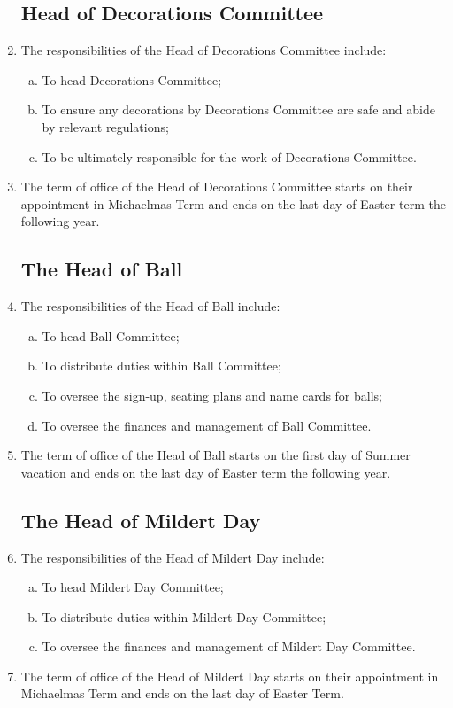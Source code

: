 \documentclass[12pt]{article}
\begin{document}
\begin{enumerate}
    \subsection{Head of Decorations Committee}
    \item The responsibilities of the Head of Decorations Committee include:
    \begin{enumerate}[(a)]
        \item To head Decorations Committee;
        \item To ensure any decorations by Decorations Committee are safe and abide by relevant regulations;
        \item To be ultimately responsible for the work of Decorations Committee.
    \end{enumerate}
    \item The term of office of the Head of Decorations Committee starts on their appointment in Michaelmas Term and ends on the last day of Easter term the following year.
    \subsection{The Head of Ball}
    \item The responsibilities of the Head of Ball include:
    \begin{enumerate}[(a)]
        \item To head Ball Committee;
        \item To distribute duties within Ball Committee;
        \item To oversee the sign-up, seating plans and name cards for balls;
        \item To oversee the finances and management of Ball Committee.
    \end{enumerate}
    \item The term of office of the Head of Ball starts on the first day of Summer vacation and ends on the last day of Easter term the following year.
    \subsection{The Head of Mildert Day}
    \item The responsibilities of the Head of Mildert Day include:
    \begin{enumerate}[(a)]
        \item To head Mildert Day Committee;
        \item To distribute duties within Mildert Day Committee;
        \item To oversee the finances and management of Mildert Day Committee.
    \end{enumerate}
    \item The term of office of the Head of Mildert Day starts on their appointment in Michaelmas Term and ends on the last day of Easter Term.

\end{enumerate}
\end{document}

